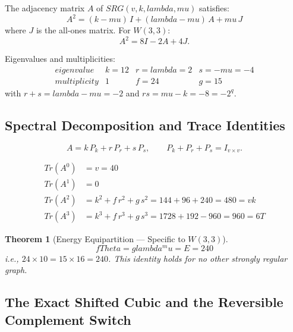 \documentclass[12pt,a4paper]{article}
\def\mathrm#1{#1}%
\def\text#1{#1}%
\def\lambda{lambda}%
\def\mu{mu}%
\def\Theta{Theta}%
\def\cdot{ }%
\newtheorem{theorem}{Theorem}[section]
\theoremstyle{definition}
\newcommand{\SRG}{\mathrm{SRG}}
\renewcommand{\Tr}{\mathrm{Tr}}
\begin{document}
The adjacency matrix $A$ of $\SRG(v,k,\lambda,\mu)$ satisfies:
\begin{equation}
\boxed{A^2 = (k-\mu)\,I + (\lambda-\mu)\,A + \mu\,J}
\label{eq:bose-mesner}
\end{equation}
where $J$ is the all-ones matrix.  For $W(3,3)$:
\begin{equation}
A^2 = 8I - 2A + 4J.
\label{eq:bm-w33}
\end{equation}

Eigenvalues and multiplicities:
\begin{equation}
\renewcommand{\arraystretch}{1.3}
\begin{array}{c|ccc}
\text{eigenvalue} & k=12 & r=\lambda=2 & s=-\mu=-4 \\
\hline
\text{multiplicity} & 1 & f=24 & g=15
\end{array}
\end{equation}
with $r+s = \lambda-\mu = -2$ and $r\cdot s = \mu-k = -8 = -2^q$.


\subsection{Spectral Decomposition and Trace Identities}

\begin{equation}
A = k\,P_k + r\,P_r + s\,P_s, \qquad
P_k+P_r+P_s = I_{v\times v}.
\end{equation}

\begin{align}
\Tr(A^0) &= v = 40 \\
\Tr(A^1) &= 0 \\
\Tr(A^2) &= k^2 + f\,r^2 + g\,s^2 = 144+96+240 = 480 = vk \\
\Tr(A^3) &= k^3 + f\,r^3 + g\,s^3 = 1728+192-960 = 960 = 6T
\end{align}

\begin{theorem}[Energy Equipartition --- Specific to $W(3,3)$]
\label{thm:equi}
\begin{equation}
\boxed{f\cdot\Theta = g\cdot\lambda^\mu = E = 240}
\end{equation}
i.e., $24\times 10 = 15\times 16 = 240$.
This identity holds for \emph{no other} strongly regular graph.
\end{theorem}

\subsection{The Exact Shifted Cubic and the Reversible Complement Switch}
\label{sec:mastercubic}
\end{document}
